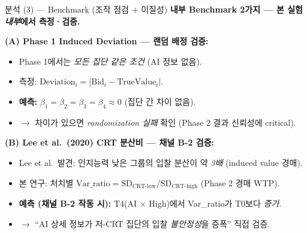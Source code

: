 \documentclass[aspectratio=169]{beamer}
\begin{document}
\begin{frame}{분석 (3) --- Benchmark  (조작 점검 + 이질성)}
  \textbf{내부 Benchmark 2가지 --- 본 실험 \emph{내부}에서 측정·검증.}

  \vspace{0.4em}
  \textbf{(A) Phase 1 Induced Deviation --- 랜덤 배정 검증:}
  \begin{itemize}\itemsep0.1em
    \item Phase 1에서는 \emph{모든 집단 같은 조건} (AI 정보 없음).
    \item 측정: $\mathrm{Deviation}_i = |\mathrm{Bid}_i - \mathrm{TrueValue}_i|$.
    \item \textbf{예측:} $\beta_1 = \beta_2 = \beta_3 = \beta_4 \approx 0$ (집단 간 차이 없음).
    \item $\rightarrow$ 차이가 있으면 \emph{randomization 실패} 확인 (Phase 2 결과 신뢰성에 critical).
  \end{itemize}

  \vspace{0.4em}
  \textbf{(B) Lee et al.\ (2020) CRT 분산비 --- 채널 B-2 검증:}
  \begin{itemize}\itemsep0.1em
    \item Lee et al.\ 발견: 인지능력 낮은 그룹의 입찰 분산이 약 \emph{3배} (induced value 경매).
    \item 본 연구: 처치별 $\mathrm{Var\_ratio} = \mathrm{SD}_{\text{CRT-low}} / \mathrm{SD}_{\text{CRT-high}}$ (Phase 2 경매 WTP).
    \item \textbf{예측 (채널 B-2 작동 시):} T4(AI $\times$ High)에서 Var\_ratio가 T0보다 \emph{증가}.
    \item $\rightarrow$ ``AI 상세 정보가 저-CRT 집단의 입찰 \emph{불안정성}을 증폭'' 직접 검증.
  \end{itemize}

  \vspace{0.2em}
\end{frame}
\end{document}
